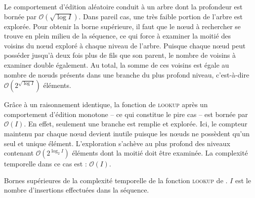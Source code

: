 \noindent Le comportement d'édition aléatoire conduit à un arbre dont la
profondeur est bornée par $\mathcal{O}(\sqrt{\log I})$. Dans pareil cas, une
très faible portion de l'arbre est explorée. Pour obtenir la borne supérieure,
il faut que le nœud à rechercher se trouve en plein milieu de la séquence, ce
qui force à examiner la moitié des voisins du nœud exploré à chaque niveau de
l'arbre. Puisque chaque nœud peut posséder jusqu'à deux fois plus de fils que
son parent, le nombre de voisins à examiner double également. Au total, la somme
de ces voisins est égale au nombre de nœuds présents dans une branche du plus
profond niveau, c'est-à-dire $\mathcal{O}(2^{\sqrt{\log I}})$ éléments.

\noindent Grâce à un raisonnement identique, la fonction de \textsc{lookup}
après un comportement d'édition monotone -- ce qui constitue le pire cas -- est
bornée par $\mathcal{O}(I)$. En effet, seulement une branche est remplie et
explorée. Ici, le compteur maintenu par chaque nœud devient inutile puisque les
nœuds ne possèdent qu'un seul et unique élément. L'exploration s'achève au plus
profond des niveaux contenant $\mathcal{O}(2^{\log_2 I})$ éléments dont la
moitié doit être examinée. La complexité temporelle dans ce cas est :
$\mathcal{O}(I)$.

\begin{table}
  \begin{center}
    \caption[Bornes supérieures de la complexité temporelle du
    \textsc{lookup} de \LSEQ] {\label{repl:table:lseqlookup} Bornes supérieures
      de la complexité temporelle de la fonction \textsc{lookup} de \LSEQ.
      $I$ est le nombre d'insertions effectuées dans la séquence.}
    
  \end{center}
\end{table}


